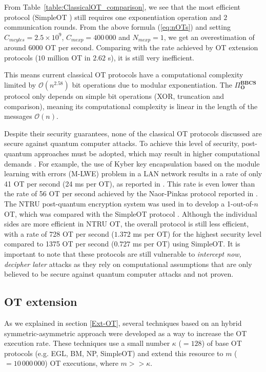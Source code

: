 From Table~\ref{table:ClassicalOT_comparison}, we see that the most efficient protocol (SimpleOT \cite{CO15}) still requires one exponentiation operation and $2$ communication rounds. From the above formula (\ref{eq:nOTs}) and setting $C_{mcyles} = 2.5 \times 10^9$, $C_{mexp} = 400\,000$ and $N_{mexp} = 1$, we get an overestimation of around $6 000$ OT per second. Comparing with the rate achieved by OT extension protocols ($10$ million OT in $2.62$ s), it is still very inefficient.

This means current classical OT protocols have a computational complexity limited by $\mathcal{O}(n^{2.58})$ bit operations due to modular exponentiation. The $\Pi^{\textbf{BBCS}}_{\textbf{O}}$ protocol only depends on simple bit operations (XOR, truncation and comparison), meaning its computational complexity is linear in the length of the messages $\mathcal{O}(n)$.

Despite their security guarantees, none of the classical OT protocols discussed are secure against quantum computer attacks. To achieve this level of security, post-quantum approaches must be adopted, which may result in higher computational demands \cite{PST19}. For example, the use of Kyber key encapsulation based on the module learning with errors (M-LWE) problem \cite{CrystalKyber17} in a LAN network results in a rate of only 41 OT per second (24 ms per OT), as reported in \cite{MR19}. This rate is even lower than the rate of 56 OT per second achieved by the Naor-Pinkas protocol \cite{NP01} reported in \cite{ALSZ13}. The NTRU post-quantum encryption system \cite{NTRU} was used in \cite{NTRUOT1, NTRUOT2} to develop a 1-out-of-$n$ OT, which was compared with the SimpleOT protocol \cite{CO15}. Although the individual sides are more efficient in NTRU OT, the overall protocol is still less efficient, with a rate of 728 OT per second ($1.372$ ms per OT) for the highest security level compared to 1375 OT per second ($0.727$ ms per OT) using SimpleOT. It is important to note that these protocols are still vulnerable to \textit{intercept now, decipher later} attacks as they rely on computational assumptions that are only believed to be secure against quantum computer attacks and not proven.


\subsection{OT extension} \label{Ext-OT_comp}

As we explained in section \ref{Ext-OT}, several techniques based on an hybrid symmetric-asymmetric approach were developed as a way to increase the OT execution rate. These techniques use a small number $\kappa$ ($=128$) of base OT protocols (e.g. EGL, BM, NP, SimpleOT) and extend this resource to $m$ ($=10\,000\,000$) OT executions, where $ m >> \kappa$. 

